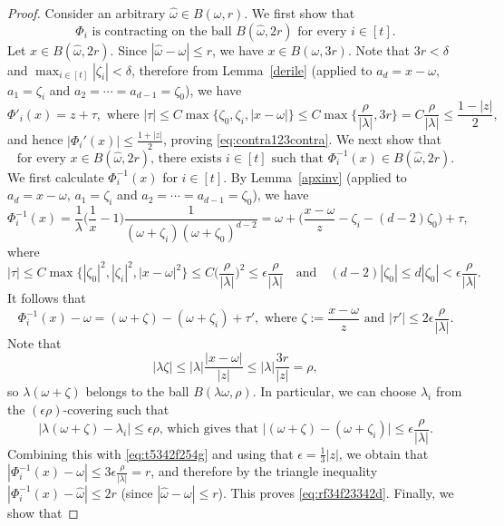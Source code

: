 \documentclass[11pt]{article}
\newcommand{\eps}{\epsilon}
\begin{document}
\begin{proof}
Consider an arbitrary $\hat{\omega}\in B(\omega,r)$. We first show that
\begin{equation}\label{eq:contra123contra}
\Phi_i\mbox{ is contracting on the ball } B(\hat{\omega},2r) \mbox{ for every $i\in[t]$}.
\end{equation}
Let $x\in B(\hat{\omega},2r)$. Since $|\hat{\omega}-\omega|\leq r$, we have $x\in  B(\omega,3r)$. Note that $3r<\delta$ and $\max_{i\in [t]} |\zeta_i|<\delta$, therefore from Lemma~\ref{derile} (applied to $a_d=x-\omega$, $a_1=\zeta_i$ and $a_2=\cdots=a_{d-1}=\zeta_0$), we have 
\[\Phi'_i(x)=z+\tau, \mbox{ where } |\tau|\leq C \max\{\zeta_0,\zeta_i,|x-\omega|\}\leq C\max\Big\{\frac{\rho}{|\lambda|}, 3r\Big\}= C\frac{\rho}{|\lambda|}\leq \frac{1-|z|}{2},\]
and hence $|\Phi_i'(x)|\leq \frac{1+|z|}{2}$, proving \eqref{eq:contra123contra}. We next show that
\begin{equation}\label{eq:rf34f23342d}
\mbox{for every $x\in B(\hat{\omega},2r)$, there exists $i\in [t]$ such that $\Phi_i^{-1}(x)\in B(\hat{\omega},2r)$}.
\end{equation}
We first calculate $\Phi_i^{-1}(x)$ for $i\in[t]$. By Lemma~\ref{apxinv} (applied to $a_d=x-\omega$, $a_1=\zeta_i$ and $a_2=\cdots=a_{d-1}=\zeta_0$), we have
$$
\Phi_i^{-1}(x) = \frac{1}{\lambda}\Big(\frac{1}{x} - 1\Big)\frac{1}{(\omega+\zeta_i)(\omega+\zeta_0)^{d-2}} = \omega + \Big(\frac{x-\omega}{z} - \zeta_i-(d-2)\zeta_0 \Big) + \tau,
$$
where 
\[|\tau|\leq C \max\{|\zeta_0|^2,|\zeta_i|^2,|x-\omega|^2\}\leq  C\Big(\frac{\rho}{|\lambda|}\Big)^2\leq\eps \frac{\rho}{|\lambda|} \quad\mbox{and}\quad (d-2)|\zeta_0|\leq d|\zeta_0|<\eps \frac{\rho}{|\lambda|}.\]
It follows that
\begin{equation}\label{eq:t5342f254g}
\Phi_i^{-1}(x) - \omega=(\omega+\zeta) - (\omega+\zeta_i)+\tau',\mbox{ where } \zeta:=\frac{x-\omega}{z} \mbox{ and }|\tau'|\leq 2\eps \frac{\rho}{|\lambda|}.
\end{equation}
Note that
\[|\lambda \zeta|\leq |\lambda| \frac{|x-\omega|}{|z|}\leq |\lambda|\frac{3r}{|z|}= \rho,\]
so $\lambda(\omega+\zeta)$ belongs to the ball $B(\lambda \omega,\rho)$. In particular, we can choose $\lambda_i$ from the $(\epsilon \rho)$-covering such that 
\[\mbox{$\big|\lambda(\omega+\zeta)-\lambda_i\big|\leq \epsilon\rho$, which gives that }\big|(\omega+\zeta)-(\omega+\zeta_i)\big|\leq \eps \frac{\rho}{|\lambda|}.\]
Combining this with \eqref{eq:t5342f254g} and using that $\epsilon=\frac{1}{3}|z|$, we obtain that $|\Phi_i^{-1}(x) - \omega|\leq 3\eps\displaystyle \frac{\rho}{|\lambda|}=r$, and therefore by the triangle inequality $|\Phi_i^{-1}(x) - \hat{\omega}|\leq 2r$ (since $|\hat{\omega}-\omega|\leq r$). This proves \eqref{eq:rf34f23342d}. Finally, we show that

\end{proof}
\end{document}
